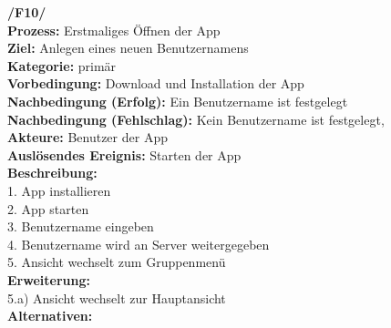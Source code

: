 \documentclass{article}
\begin{document}
\textbf{/F10/} \\
\textbf{Prozess:} Erstmaliges Öffnen der App \\
\textbf{Ziel:} Anlegen eines neuen Benutzernamens \\
\textbf{Kategorie:} primär \\
\textbf{Vorbedingung:} Download und Installation der App \\
\textbf{Nachbedingung (Erfolg):} Ein Benutzername ist festgelegt \\
\textbf{Nachbedingung (Fehlschlag):} Kein Benutzername ist festgelegt,\\
\textbf{Akteure:} Benutzer der App \\
\textbf{Auslösendes Ereignis:} Starten der App\\
\textbf{Beschreibung:} \\
1. App installieren \\
2. App starten       \\
3. Benutzername eingeben \\
4. Benutzername wird an Server weitergegeben \\
5. Ansicht wechselt zum Gruppenmenü \\
\textbf{Erweiterung:} \\
5.a) Ansicht wechselt zur Hauptansicht\\
\textbf{Alternativen:} \\
\end{document}
